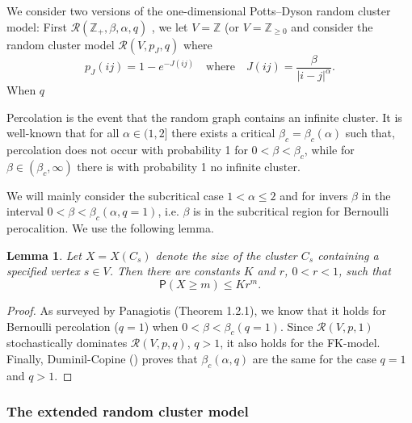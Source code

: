 \documentclass[11pt, a4paper]{amsart}
\newtheorem{lem}[thm]{Lemma}
\theoremstyle{definition}
\theoremstyle{remark}
\providecommand{\ZZ}{\mathbb{Z}}
\providecommand{\mscr}{\mathscr}
\renewcommand{\P}{\mathsf{P}}
\begin{document}
We consider two versions of the one-dimensional Potts--Dyson random cluster
model: First $\mscr R(\ZZ_+,\beta,\alpha,q)$ , we let $V=\ZZ$ (or $V=\ZZ_{\ge0}$ and consider the
random cluster model $\mscr R(V,p_J,q)$ where
\begin{equation}\label{eq:Jdef}
  p_J(ij) = 1-e^{-J(ij)} \quad\text{where}\quad 
  J({ij}) = \frac \beta{|i-j|^\alpha}.
\end{equation}
When $q$

Percolation is the event that the random graph contains an infinite cluster. It
is well-known \cite{ACCN} that for all $\alpha\in(1,2]$ there exists a critical
$\beta_c=\beta_c(\alpha)$ such that, percolation does not occur with probability 1 for
$0<\beta<\beta_c$, while for $\beta\in(\beta_c,\infty)$ there is with probability 1 no infinite
cluster.

We will mainly consider the subcritical case $1<\alpha\le 2$ and for invers $\beta$ in the
interval $0<\beta <\beta_c(\alpha,q=1)$, i.e. $\beta$ is in the subcritical region for Bernoulli
perocalition. We use the following lemma.
\begin{lem}\label{geometric-bound}
 Let $X=X(C_s)$ denote the size of the cluster $C_s$ 
 containing a specified vertex $s\in V$. Then there are constants 
 $K$ and $r$, $0<r<1$, such that $$\P(X\ge m)\le K r^{m}. $$ 
\end{lem}
\begin{proof}
  As surveyed by Panagiotis \cite{panagiotis} (Theorem 1.2.1), we know that it
  holds for Bernoulli percolation ($q=1$) when $0<\beta<\beta_c(q=1)$. Since
  $\mscr R(V,p,1)$ stochastically dominates $\mscr R(V,p,q)$, $q>1$, it also
  holds for the FK-model. Finally, Duminil-Copine (\cite{duminil}) proves that
  $\beta_c(\alpha,q)$ are the same for the case $q=1$ and $q>1$.
\end{proof}

\subsubsection{The extended random cluster model}
\end{document}
